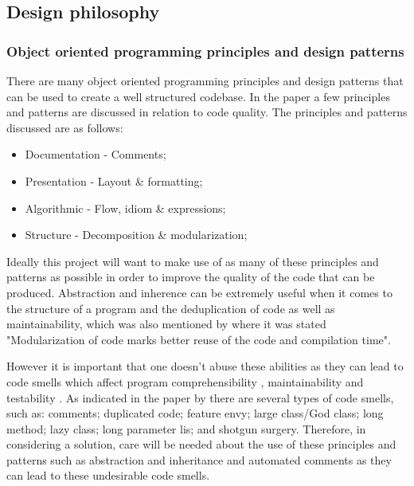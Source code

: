 \subsection{Design philosophy}

\subsubsection{Object oriented programming principles and design patterns}
There are many object oriented programming principles and design patterns that can be used to create a well structured codebase. In the paper \cite{10.1145/3428029.3428047} a few principles and patterns are discussed in relation to code quality. The principles and patterns discussed are as follows:
\begin{itemize}
	\item Documentation - Comments;
	\item Presentation - Layout \& formatting;
	\item Algorithmic - Flow, idiom \& expressions;
	\item Structure - Decomposition \& modularization;
\end{itemize}

Ideally this project will want to make use of as many of these principles and patterns as possible in order to improve the quality of the code that can be produced. Abstraction and inherence can be extremely useful when it comes to the structure of a program and the deduplication of code as well as maintainability, which was also mentioned by \cite{8681007} where it was stated "Modularization of code marks better reuse of the code and compilation time".

However it is important that one doesn't abuse these abilities as they can lead to code smells which affect program comprehensibility \citep{8681007, ImpactOfAntipatterns}, maintainability \citep{8681007, ImpactOfAntipatterns2, CodeSmellsAndMaintainability} and testability \citep{8681007, TestCasesAndCodeQuality}. As indicated in the paper by \cite{10.1145/3555228.3555268} there are several types of code smells, such as: comments; duplicated code; feature envy; large class/God class; long method; lazy class; long parameter lis; and shotgun surgery. Therefore, in considering a solution, care will be needed about the use of these principles and patterns such as abstraction and inheritance and automated comments as they can lead to these undesirable code smells.

